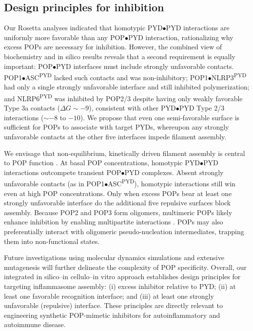 \documentclass[11pt]{article}
\begin{document}
\subsection{Design principles for inhibition}
Our Rosetta analyses indicated that homotypic PYD$\bullet$PYD interactions are uniformly more favorable than any POP$\bullet$PYD interaction, rationalizing why excess POPs are necessary for inhibition. However, the combined view of biochemistry and in silico results reveals that a second requirement is equally important: POP$\bullet$PYD interfaces must include strongly unfavorable contacts. POP1$\bullet$ASC\textsuperscript{PYD} lacked such contacts and was non-inhibitory; POP1$\bullet$NLRP3\textsuperscript{PYD} had only a single strongly unfavorable interface and still inhibited polymerization; and NLRP6\textsuperscript{PYD} was inhibited by POP2/3 despite having only weakly favorable Type 3a contacts ($\Delta G\sim -9$), consistent with other PYD$\bullet$PYD Type 2/3 interactions ($\sim -8$ to $-10$). We propose that even one semi-favorable surface is sufficient for POPs to associate with target PYDs, whereupon any strongly unfavorable contacts at the other five interfaces impede filament assembly.

We envisage that non-equilibrium, kinetically driven filament assembly is central to POP function \citep{cai2014,matyszewski2018}. At basal POP concentrations, homotypic PYD$\bullet$PYD interactions outcompete transient POP$\bullet$PYD complexes. Absent strongly unfavorable contacts (as in POP1$\bullet$ASC\textsuperscript{PYD}), homotypic interactions still win even at high POP concentrations. Only when excess POPs bear at least one strongly unfavorable interface do the additional five repulsive surfaces block assembly. Because POP2 and POP3 form oligomers, multimeric POPs likely enhance inhibition by enabling multipartite interactions \citep{matyszewski2021}. POPs may also preferentially interact with oligomeric pseudo-nucleation intermediates, trapping them into non-functional states.

Future investigations using molecular dynamics simulations and extensive mutagenesis will further delineate the complexity of POP specificity. Overall, our integrated in silico--in cellulo--in vitro approach establishes design principles for targeting inflammasome assembly: (i) excess inhibitor relative to PYD; (ii) at least one favorable recognition interface; and (iii) at least one strongly unfavorable (repulsive) interface. These principles are directly relevant to engineering synthetic POP-mimetic inhibitors for autoinflammatory and autoimmune disease.



\end{document}
